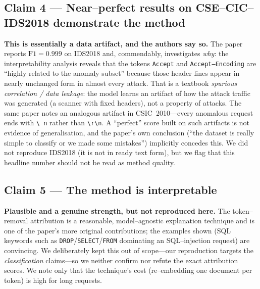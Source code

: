 \documentclass[11pt,a4paper]{article}
\begin{document}
\subsection{Claim 4 --- Near--perfect results on CSE--CIC--IDS2018 demonstrate the method}
\textbf{This is essentially a data artifact, and the authors say so.} The paper reports
$\text{F1}=0.999$ on IDS2018 and, commendably, investigates \emph{why}: the interpretability
analysis reveals that the tokens \texttt{Accept} and \texttt{Accept--Encoding} are
``highly related to the anomaly subset'' because those header lines appear in nearly
unchanged form in almost every attack. That is a textbook \emph{spurious correlation /
data leakage}: the model learns an artifact of how the attack traffic was generated
(a scanner with fixed headers), not a property of attacks. The same paper notes an
analogous artifact in CSIC~2010---every anomalous request ends with \texttt{\textbackslash
n} rather than \texttt{\textbackslash r\textbackslash n}. A ``perfect'' score built on
such artifacts is not evidence of generalisation, and the paper's own conclusion (``the
dataset is really simple to classify or we made some mistakes'') implicitly concedes this.
We did not reproduce IDS2018 (it is not in ready text form), but we flag that this
headline number should not be read as method quality.

\subsection{Claim 5 --- The method is interpretable}
\textbf{Plausible and a genuine strength, but not reproduced here.} The token--removal
attribution is a reasonable, model--agnostic explanation technique and is one of the
paper's more original contributions; the examples shown (SQL keywords such as
\texttt{DROP}/\texttt{SELECT}/\texttt{FROM} dominating an SQL--injection request) are
convincing. We deliberately kept this out of scope---our reproduction targets the
\emph{classification} claims---so we neither confirm nor refute the exact attribution
scores. We note only that the technique's cost (re--embedding one document per token) is
high for long requests.
\end{document}
